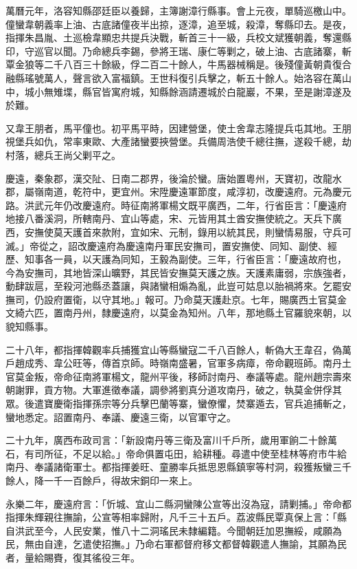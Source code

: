 \begin{pinyinscope}
萬曆元年，洛容知縣邵廷臣以養歸，主簿謝漳行縣事。會上元夜，單騎巡檄山中。僮蠻韋朝義率上油、古底諸僮夜半出掠，逐漳，追至城，殺漳，奪縣印去。是夜，指揮朱昌胤、土巡檢韋顯忠共提兵決戰，斬首三十一級，兵校文斌獲朝義，奪還縣印，守巡官以聞。乃命總兵李錫，參將王瑞、康仁等剿之，破上油、古底諸寨，斬覃金狼等二千八百三十餘級，俘二百二十餘人，牛馬器械稱是。後殘僮黃朝貴復合融縣瑤號萬人，聲言欲入富福鎮。王世科復引兵擊之，斬五十餘人。始洛容在萬山中，城小無雉堞，縣官皆寓府城，知縣餘涵請遷城於白龍巖，不果，至是謝漳遂及於難。

又韋王朋者，馬平僮也。初平馬平時，因建營堡，使土舍韋志隆提兵屯其地。王朋視堡兵如仇，常率東歐、大產諸蠻要挾營堡。兵備周浩使千總往撫，遂殺千總，劫村落，總兵王尚父剿平之。

慶遠，秦象郡，漢交阯、日南二郡界，後淪於蠻。唐始置粵州，天寶初，改龍水郡，屬嶺南道，乾符中，更宜州。宋陞慶遠軍節度，咸淳初，改慶遠府。元為慶元路。洪武元年仍改慶遠府。時征南將軍楊文既平廣西，二年，行省臣言：「慶遠府地接八番溪洞，所轄南丹、宜山等處，宋、元皆用其土酋安撫使統之。天兵下廣西，安撫使莫天護首來款附，宜如宋、元制，錄用以統其民，則蠻情易服，守兵可滅。」帝從之，詔改慶遠府為慶遠南丹軍民安撫司，置安撫使、同知、副使、經歷、知事各一員，以天護為同知，王毅為副使。三年，行省臣言：「慶遠故府也，今為安撫司，其地皆深山曠野，其民皆安撫莫天護之族。天護素庸弱，宗族強者，動肆跋扈，至殺河池縣丞蓋讓，與諸蠻相煽為亂，此豈可姑息以胎禍將來。乞罷安撫司，仍設府置衛，以守其地。」報可。乃命莫天護赴京。七年，賜廣西土官莫金文綺六匹，置南丹州，隸慶遠府，以莫金為知州。八年，那地縣土官羅貌來朝，以貌知縣事。

二十八年，都指揮韓觀率兵捕獲宜山等縣蠻寇二千八百餘人，斬偽大王韋召，偽萬戶趙成秀、韋公旺等，傳首京師。時嶺南盛暑，官軍多病瘴，帝命觀班師。南丹土官莫金叛，帝命征南將軍楊文，龍州平後，移師討南丹、奉議等處。龍州趙宗壽來朝謝罪，貢方物。大軍進徵奉議，調參將劉真分道攻南丹，破之，執莫金併俘其眾。後遣寶慶衛指揮孫宗等分兵擊巴蘭等寨，蠻僚懼，焚寨遁去，官兵追捕斬之，蠻地悉定。詔置南丹、奉議、慶遠三衛，以官軍守之。

二十九年，廣西布政司言：「新設南丹等三衛及富川千戶所，歲用軍餉二十餘萬石，有司所征，不足以給。」帝命俱置屯田，給耕種。尋遣中使至桂林等府市牛給南丹、奉議諸衛軍士。都指揮姜旺、童勝率兵抵思恩縣鎮寧等村洞，殺獲叛蠻三千餘人，降一千一百餘戶，得故宋銅印一來上。

永樂二年，慶遠府言：「忻城、宜山二縣洞蠻陳公宣等出沒為寇，請剿捕。」帝命都指揮朱輝親往撫諭，公宣等相率歸附，凡千三十五戶。荔波縣民覃真保上言：「縣自洪武至今，人民安業，惟八十二洞瑤民未隸編籍。今聞朝廷加恩撫綏，咸願為民，無由自達，乞遣使招撫。」乃命右軍都督府移文都督韓觀遣人撫諭，其願為民者，量給賜賚，復其徭役三年。


\end{pinyinscope}
